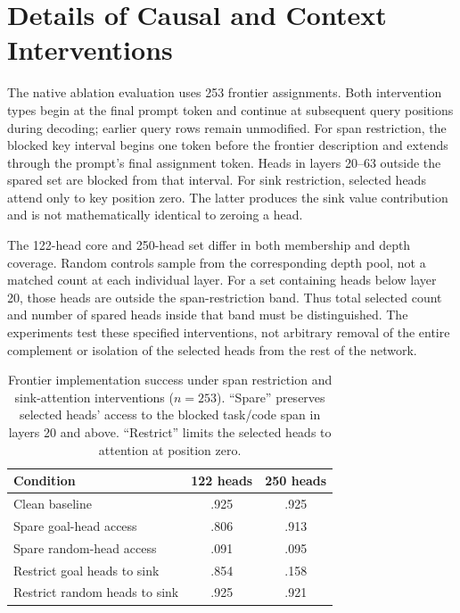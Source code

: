 \section{Details of Causal and Context Interventions}
\label{app:ablation}
The native ablation evaluation uses 253 frontier assignments. Both intervention types begin at the final prompt token and continue at subsequent query positions during decoding; earlier query rows remain unmodified. For span restriction, the blocked key interval begins one token before the frontier description and extends through the prompt's final assignment token. Heads in layers 20--63 outside the spared set are blocked from that interval. For sink restriction, selected heads attend only to key position zero. The latter produces the sink value contribution and is not mathematically identical to zeroing a head.

The 122-head core and 250-head set differ in both membership and depth coverage. Random controls sample from the corresponding depth pool, not a matched count at each individual layer. For a set containing heads below layer 20, those heads are outside the span-restriction band. Thus total selected count and number of spared heads inside that band must be distinguished. The experiments test these specified interventions, not arbitrary removal of the entire complement or isolation of the selected heads from the rest of the network.



\begin{table}[ht]
\centering\small
\begin{tabular}{lcc}
\toprule
Condition & 122 heads & 250 heads\\
\midrule
Clean baseline & .925 & .925\\
Spare goal-head access & .806 & .913\\
Spare random-head access & .091 & .095\\
\midrule
Restrict goal heads to sink & .854 & .158\\
Restrict random heads to sink & .925 & .921\\
\bottomrule
\end{tabular}
\caption{Frontier implementation success under span restriction and sink-attention interventions ($n=253$). ``Spare'' preserves selected heads' access to the blocked task/code span in layers 20 and above. ``Restrict'' limits the selected heads to attention at position zero.}
\label{tab:goal-ablation-exact}
\end{table}

